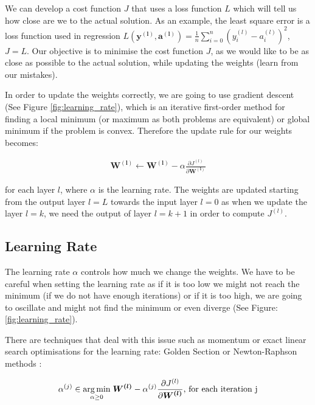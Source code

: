 We can develop a cost function $J$ that uses a loss function $L$ which will tell us how close are we to the actual solution. As an example, the least square error is a loss function used in regression $L(\boldsymbol{y^{(l)}}, \boldsymbol{a^{(l)}}) = \frac{1}{n} \sum^{n}_{i = 0} (y^{(l)}_i - a^{(l)}_i) ^ 2$, $J = L$. Our objective is to minimise the cost function $J$, as we would like to be as close as possible to the actual solution, while updating the weights (learn from our mistakes).

In order to update the weights correctly, we are going to use gradient descent (See Figure \ref{fig:learning_rate}), which is an iterative first-order method for finding a local minimum (or maximum as both problems are equivalent) or global minimum if the problem is convex. Therefore the update rule for our weights becomes:

\begin{align*}
    \boldsymbol{W^{(l)}} \gets \boldsymbol{W^{(l)}} - \alpha \frac{\partial J^{(l)}}{\partial \boldsymbol{W^{(l)}}}
\end{align*}

for each layer $l$, where $\alpha$ is the learning rate. The weights are updated starting from the output layer $l=L$ towards the input layer $l=0$ as when we update the layer $l=k$, we need the output of layer $l=k+1$ in order to compute $J^{(l)}$.

\subsection{Learning Rate}
The learning rate \cite{ml} $\alpha$ controls how much we change the weights. We have to be careful when setting the learning rate as if it is too low we might not reach the minimum (if we do not have enough iterations) or if it is too high, we are going to oscillate and might not find the minimum or even diverge (See Figure: \ref{fig:learning_rate}).

There are techniques that deal with this issue such as momentum or exact linear search optimisations for the learning rate: Golden Section or Newton-Raphson methods \cite{chong2013introduction}: 

$$\alpha^{(j)} \in \underset{\alpha \geq 0}{\arg \min} \hspace{0.1cm} \boldsymbol{W^{(l)}} - \alpha^{(j)} \frac{\partial J^{(l)}}{\partial \boldsymbol{W^{(l)}}}\textrm{, for each iteration j}$$

